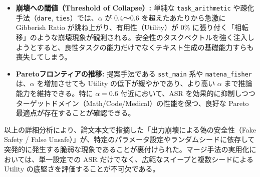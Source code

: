 \begin{itemize}
    \item \textbf{崩壊への閾値（Threshold of Collapse）:} 単純な \texttt{task\_arithmetic} や疎化手法（\texttt{dare}, \texttt{ties}）では、$\alpha$ が 0.4〜0.6 を超えたあたりから急激に Gibberish Ratio が跳ね上がり、有用性（Utility）が 0\% に張り付く「相転移」のような崩壊現象が観測される。安全性のタスクベクトルを強く注入しようとすると、良性タスクの能力だけでなくテキスト生成の基礎能力すらも喪失してしまう。
    \item \textbf{Paretoフロンティアの推移:} 提案手法である \texttt{sst\_main} 系や \texttt{matena\_fisher} は、$\alpha$ を増加させても Utility の低下が緩やかであり、より高い $\alpha$ まで推論能力を維持できる。特に $\alpha=0.6$ 付近において、ASR を効果的に抑制しつつターゲットドメイン（Math/Code/Medical）の性能を保つ、良好な Pareto 最適点が存在することが確認できる。
\end{itemize}

以上の詳細分析により、論文本文で指摘した「出力崩壊による偽の安全性（Fake Safety / False Unsafe）」が、特定のパラメータ設定やランダムシードに依存して突発的に発生する脆弱な現象であることが裏付けられた。マージ手法の実用化においては、単一設定での ASR だけでなく、広範なスイープと複数シードによる Utility の底堅さを評価することが不可欠である。

\newpage
